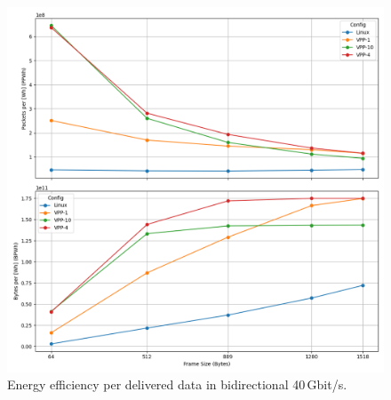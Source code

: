 \begin{figure}[!htbp]
    \centering
    \includegraphics[width=\linewidth]{images/consumption-bi-40g.png}
    \caption{Energy efficiency per delivered data in bidirectional 40\,Gbit/s.}
    \label{fig:bi-40g}
\end{figure}

